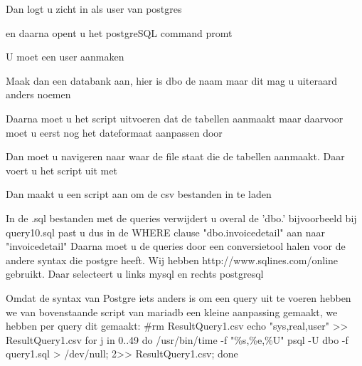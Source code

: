 \documentclass[fleqn,10pt]{artikeltin}
\begin{document}
{Dan logt u zicht in als user van postgres
  \par
en daarna opent u het postgreSQL command promt 
 \par

U moet een user aanmaken
  \par

Maak dan een databank aan, hier is dbo de naam maar dit mag u uiteraard anders noemen
 \par

Daarna moet u het script uitvoeren dat de tabellen aanmaakt maar daarvoor moet u eerst nog het dateformaat 
aanpassen door 
 \par

Dan moet u navigeren naar waar de file staat die de tabellen aanmaakt.
Daar voert u het script uit met 
 \par

Dan maakt u een script aan om de csv bestanden in te laden
 \par
In de .sql bestanden met de queries verwijdert u overal de 'dbo.' bijvoorbeeld bij query10.sql past u dus in de WHERE clause "dbo.invoicedetail" aan naar "invoicedetail"
Daarna moet u de queries door een conversietool halen voor de andere syntax die postgre heeft. 
Wij hebben http://www.sqlines.com/online gebruikt. Daar selecteert u links mysql en rechts postgresql

Omdat de syntax van Postgre iets anders is om een query uit te voeren hebben we van bovenstaande script van mariadb een kleine aanpassing gemaakt, we hebben per query dit gemaakt:
\#rm ResultQuery1.csv
echo "sys,real,user" >> ResultQuery1.csv
for j in {0..49}
do
{ /usr/bin/time -f "\%s,\%e,\%U" psql -U dbo -f query1.sql > /dev/null; } 2>> ResultQuery1.csv;
done 

}
\end{document}
